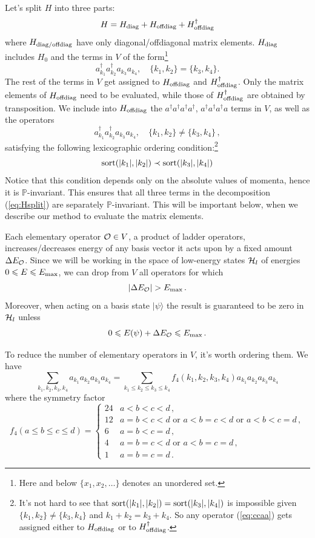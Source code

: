 \documentclass[11pt]{article}
\newcommand{\reef}[1]{(\ref{#1})}
\newcommand{\beq}{\begin{equation}}
\newcommand{\eeq}{\end{equation}}
\def\calO {{\cal O}}
\def\calH {{\cal H}}
\def\bP {\mathbb{P}}
\def\le{\leqslant}
\newcommand{\ket}[1]{|#1\rangle}
\def \Emax{E_{\rm max}}
\numberwithin{equation}{section}
\begin{document}
\noindent Let's split $H$ into three parts:
\beq
\label{eq:Hsplit}
H=H_{\rm diag}+H_{\rm offdiag}+H^\dagger_{\rm offdiag}
\eeq
where $H_{\rm diag/offdiag}$ have only diagonal/offdiagonal matrix elements. $H_{\rm diag}$ includes $H_0$ and the terms in $V$ of the form\footnote{Here and below $\{x_1,x_2,\ldots\}$ denotes an unordered set.}
\beq
a^\dagger_{k_1}a^\dagger_{k_2}a_{k_3}a_{k_4},\quad \{k_1,k_2\} = \{k_3,k_4\}.
\eeq 
The rest of the terms in $V$ get assigned to $H_{\rm offdiag}$ and $H_{\rm offdiag}^\dagger$. Only the matrix elements of $H_{\rm offdiag}$ need to be evaluated, while those of $H_{\rm offdiag}^\dagger$ are obtained by transposition. We include into $H_{\rm offdiag}$ the $a^\dagger a^\dagger a^\dagger a^\dagger$, $a^\dagger a^\dagger a^\dagger a$ terms in $V$, 
as well as the operators
\beq
\label{eq:ccaa}
a^\dagger_{k_1} a^\dagger_{k_2} a_{k_3} a_{k_4},\quad \{k_1,k_2\} \ne \{k_3,k_4\}\,,
\eeq  
satisfying the following lexicographic ordering condition:\footnote{It's not hard to see that ${\rm sort}(|k_1|,|k_2|)= {\rm sort}(|k_3|,|k_4|)$ is impossible given $\{k_1,k_2\} \ne \{k_3,k_4\}$ and $k_1+k_2=k_3+k_4$. So any operator \reef{eq:ccaa} gets assigned either to $H_{\rm offdiag}$ or to $H^\dagger_{\rm offdiag}$.}
\beq
\label{eq:lex}
{\rm sort}(|k_1|,|k_2|)\prec {\rm sort}(|k_3|,|k_4|)
\eeq
Notice that this condition depends only on the absolute values of momenta, hence it is $\bP$-invariant. This ensures that all three terms in the decomposition \reef{eq:Hsplit} are separately $\bP$-invariant. This will be important below, when we describe our method to evaluate the matrix elements.


\nopagebreak

\noindent Each elementary operator $\calO\in V$, a product of ladder operators, increases/decreases energy of any basis vector it acts upon by a fixed amount $\Delta E_\calO$. Since we will be working in the space of low-energy states $\calH_l$ of energies $0\le E\le \Emax$, we can drop from $V$ all operators for which 
\beq
|\Delta E_\calO|> \Emax\,.
\eeq
Moreover, when acting on a basis state $\ket{\psi}$ the result is guaranteed to be zero in $\calH_l$ unless
\beq
0 \le E(\psi)+\Delta E_\calO\le \Emax\,.
\eeq


\nopagebreak

\noindent To reduce the number of elementary operators in $V$, it's worth ordering them. We have
\beq
\sum_{k_1,k_2,k_3,k_4}  a_{k_1}a_{k_2}a_{k_3}a_{k_4} = \sum_{k_1\le k_2\le k_3 \le k_4} f_4(k_1,k_2,k_3,k_4) a_{k_1}a_{k_2}a_{k_3}a_{k_4}
\eeq
where the symmetry factor
\beq
f_4(a\le b\le c\le d)=\begin{cases}
24& a<b<c<d\,, \\
12& a=b<c<d\text{ or }a<b=c<d\text{ or }a<b<c=d\,,\\
6& a=b<c=d\,, \\
4 & a=b=c<d\text{ or }a<b=c=d\,,\\
1 & a=b=c=d\,.
\end{cases}
\eeq
\end{document}
